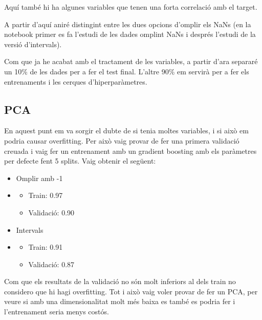 \documentclass[9pt,a4paper,twoside]{tau-class/tau}
\begin{document}
    Aquí també hi ha algunes variables que tenen una forta correlació amb el target.

    A partir d'aquí aniré distingint entre les dues opcions d'omplir els NaNs (en la notebook primer es fa l'estudi de les dades omplint NaNs i després l'estudi de la versió d'intervals).

    Com que ja he acabat amb el tractament de les variables, a partir d'ara separaré un 10\% de les dades per a fer el test final. L'altre 90\% em servirà per a fer els entrenaments i les cerques d'hiperparàmetres.

    \subsection{PCA}
    En aquest punt em va sorgir el dubte de si tenia moltes variables, i si això em podria causar overfitting. Per això vaig provar de fer una primera validació creuada i vaig fer un entrenament amb un gradient boosting amb els paràmetres per defecte fent 5 splits. Vaig obtenir el següent:
    \begin{itemize}
        \item Omplir amb -1
        \item \begin{itemize}
            \item Train: 0.97
            \item Validació: 0.90
        \end{itemize}
        \item Intervals
        \item \begin{itemize}
            \item Train: 0.91
            \item Validació: 0.87
        \end{itemize}
    \end{itemize}
    Com que els resultats de la validació no són molt inferiors al dels train no considero que hi hagi overfitting. Tot i això vaig voler provar de fer un PCA, per veure si amb una dimensionalitat molt més baixa es també es podria fer i l'entrenament seria menys costós.
\end{document}
